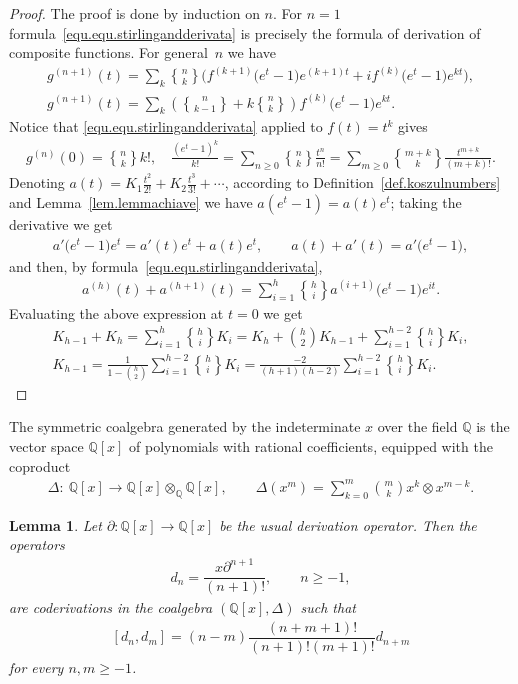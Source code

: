 \documentclass[pdftex]{sigma}
\newcommand{\stirl}[2]{\genfrac{\{}{\}}{0pt}{}{#1}{#2}}
\newcommand{\de}{\partial}
\newcommand{\Q}{\mathbb{Q}}
\numberwithin{equation}{section}
\newtheorem{Lemma}[Theorem]{Lemma}
 { \theoremstyle{definition}
\newtheorem{Definition}[Theorem]{Definition}
\newtheorem{Example}[Theorem]{Example}
\newtheorem{Remark}[Theorem]{Remark} }
\begin{document}
\begin{proof}
The proof is done by induction on $n$. For $n=1$ formula~\eqref{equ.equ.stirlingandderivata}
is precisely the formula of derivation of composite functions. For general~$n$ we have
\begin{gather*}
g^{(n+1)}(t) =\sum_{k} \stirl{n}{k}\big(f^{(k+1)}\big(e^t-1\big)e^{(k+1)t}+if^{(k)}\big(e^t-1\big)e^{kt}\big),\\
g^{(n+1)}(t) =\sum_{k} \left(\stirl{n}{k-1}+k\stirl{n}{k}\right)f^{(k)}\big(e^t-1\big)e^{kt}.
 \end{gather*}
Notice that \eqref{equ.equ.stirlingandderivata} applied to
$f(t)=t^k$ gives
\begin{gather*}%
g^{(n)}(0)=\stirl{n}{k}k! ,\quad
\frac{(e^t-1)^k}{k!}=\sum_{n\ge 0}\stirl{n}{k}\frac{t^n}{n!}=
\sum_{m\ge 0}\stirl{m+k}{k}\frac{t^{m+k}}{(m+k)!} .
\end{gather*}
Denoting $a(t)=K_1\frac{t^2}{2!}+K_2\frac{t^3}{3!}+\cdots$, according to
Def\/inition~\ref{def.koszulnumbers} and
Lemma~\ref{lem.lemmachiave} we have
$a(e^t-1)=a(t)e^{t}$;
taking the derivative we get
\begin{gather*} a'\big(e^t-1\big)e^t=a'(t)e^t+a(t)e^t,\qquad a(t)+a'(t)=a'\big(e^t-1\big),\end{gather*}
and then, by formula~\eqref{equ.equ.stirlingandderivata},
\begin{gather*} a^{(h)}(t)+a^{(h+1)}(t)=\sum_{i=1}^h \stirl{h}{i} a^{(i+1)}\big(e^t-1\big)e^{it} .\end{gather*}
Evaluating the above expression at $t=0$ we get
\begin{gather*} K_{h-1}+K_h=\sum_{i=1}^h \stirl{h}{i}K_i=K_h+\binom{h}{2}K_{h-1}+
\sum_{i=1}^{h-2} \stirl{h}{i}K_i, \\
 K_{h-1}=\frac{1}{1-\binom{h}{2}}\sum_{i=1}^{h-2} \stirl{h}{i}K_i=
\frac{-2}{(h+1)(h-2)}\sum_{i=1}^{h-2} \stirl{h}{i}K_i .\tag*{\qed}
\end{gather*}
\renewcommand{\qed}{}
\end{proof}

The symmetric coalgebra generated by the indeterminate $x$ over the f\/ield $\Q$ is the vector space $\Q[x]$ of polynomials with rational coef\/f\/icients, equipped with the coproduct
\begin{gather*} \Delta\colon \ \Q[x]\to \Q[x]\otimes_{\Q} \Q[x],\qquad \Delta(x^m)=\sum_{k=0}^{m}
\binom{m}{k}x^k\otimes x^{m-k}.\end{gather*}

\begin{Lemma}
Let $\de\colon \Q[x]\to \Q[x]$ be the usual derivation operator. Then the operators
\begin{gather*}d_n=\dfrac{x\partial^{n+1}}{ (n+1)! },\qquad n\ge -1,\end{gather*}
are coderivations in the coalgebra
$(\Q[x],\Delta)$ such that
\begin{gather}\label{equ.bracketdenne}
[d_n,d_m]=(n-m)\dfrac{(n+m+1)!}{(n+1)!(m+1)!}
d_{n+m} \end{gather}
for every $n,m\ge -1$.
\end{Lemma}
\end{document}
